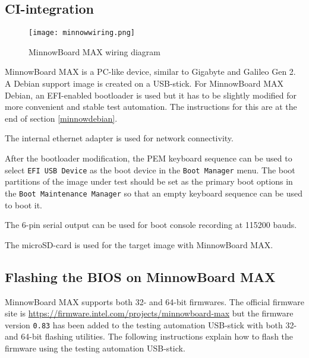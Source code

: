 \documentclass[a4paper,11pt]{article}
\newcommand{\cmd}[1]{\texttt{#1}}
\begin{document}
\subsection{CI-integration}

\begin{figure}[h]
	\centering
	\texttt{[image: minnowwiring.png]}
	\caption{MinnowBoard MAX wiring diagram}
	\label{fig:minnowwiring}
\end{figure}

MinnowBoard MAX is a PC-like device, similar to Gigabyte and Galileo Gen 2. A Debian support image is created on a USB-stick. For MinnowBoard MAX Debian, an EFI-enabled bootloader is used but it has to be slightly modified for more convenient and stable test automation. The instructions for this are at the end of section \ref{minnowdebian}.

The internal ethernet adapter is used for network connectivity.

After the bootloader modification, the PEM keyboard sequence can be used to select \cmd{EFI USB Device} as the boot device in the \cmd{Boot Manager} menu. The boot partitions of the image under test should be set as the primary boot options in the \cmd{Boot Maintenance Manager} so that an empty keyboard sequence can be used to boot it.

The 6-pin serial output can be used for boot console recording at 115200 bauds.

The microSD-card is used for the target image with MinnowBoard MAX.

\subsection{Flashing the BIOS on MinnowBoard MAX}

MinnowBoard MAX supports both 32- and 64-bit firmwares. The official firmware site is \url{https://firmware.intel.com/projects/minnowboard-max} but the firmware version \cmd{0.83} has been added to the testing automation USB-stick with both 32- and 64-bit flashing utilities. The following instructions explain how to flash the firmware using the testing automation USB-stick.
\end{document}
